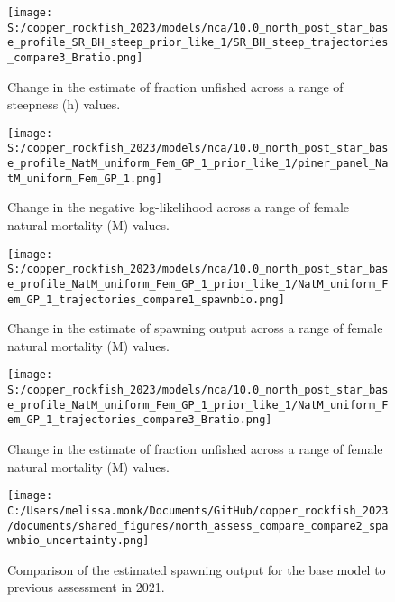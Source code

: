 \documentclass[11pt,
  letterpaper,
]{article}
\begin{document}
\pagebreak

\begin{figure}
{\centering
\texttt{[image: S:/copper\_rockfish\_2023/models/nca/10.0\_north\_post\_star\_base\_profile\_SR\_BH\_steep\_prior\_like\_1/SR\_BH\_steep\_trajectories\_compare3\_Bratio.png]}
}
\caption{Change in the estimate of fraction unfished across a range of steepness (h) values.\label{fig:h-depl}}
\end{figure}

\pagebreak

\begin{figure}
{\centering
\texttt{[image: S:/copper\_rockfish\_2023/models/nca/10.0\_north\_post\_star\_base\_profile\_NatM\_uniform\_Fem\_GP\_1\_prior\_like\_1/piner\_panel\_NatM\_uniform\_Fem\_GP\_1.png]}
}
\caption{Change in the negative log-likelihood across a range of female natural mortality (M) values.\label{fig:m-profile}}
\end{figure}

\pagebreak

\begin{figure}
{\centering
\texttt{[image: S:/copper\_rockfish\_2023/models/nca/10.0\_north\_post\_star\_base\_profile\_NatM\_uniform\_Fem\_GP\_1\_prior\_like\_1/NatM\_uniform\_Fem\_GP\_1\_trajectories\_compare1\_spawnbio.png]}
}
\caption{Change in the estimate of spawning output across a range of female natural mortality (M) values.\label{fig:m-ssb}}
\end{figure}

\pagebreak

\begin{figure}
{\centering
\texttt{[image: S:/copper\_rockfish\_2023/models/nca/10.0\_north\_post\_star\_base\_profile\_NatM\_uniform\_Fem\_GP\_1\_prior\_like\_1/NatM\_uniform\_Fem\_GP\_1\_trajectories\_compare3\_Bratio.png]}
}
\caption{Change in the estimate of fraction unfished across a range of female natural mortality (M) values.\label{fig:m-depl}}
\end{figure}

\begin{figure}
{\centering
\texttt{[image: C:/Users/melissa.monk/Documents/GitHub/copper\_rockfish\_2023/documents/shared\_figures/north\_assess\_compare\_compare2\_spawnbio\_uncertainty.png]}
}
\caption{Comparison of the estimated spawning output for the base model to previous assessment in 2021.\label{fig:comp-assess-sb}}
\end{figure}
\end{document}

